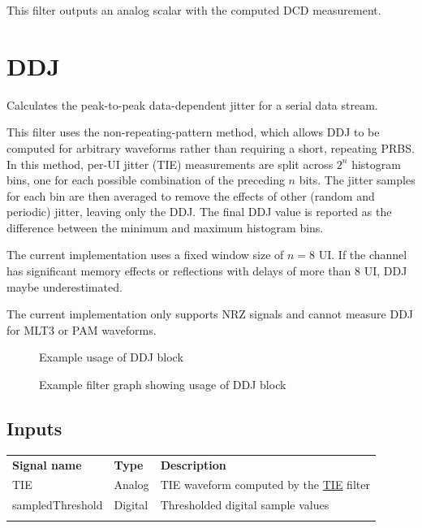 This filter outputs an analog scalar with the computed DCD measurement.

\pagebreak
\section{DDJ}
\label{filter:ddj}

Calculates the peak-to-peak data-dependent jitter for a serial data stream.

This filter uses the non-repeating-pattern method, which allows DDJ to be computed for arbitrary waveforms rather than
requiring a short, repeating PRBS. In this method, per-UI jitter (TIE) measurements are split across $2^n$ histogram
bins, one for each possible combination of the preceding $n$ bits. The jitter samples for each bin are then averaged to
remove the effects of other (random and periodic) jitter, leaving only the DDJ.  The final DDJ value is reported as the
difference between the minimum and maximum histogram bins.

The current implementation uses a fixed window size of $n=8$ UI. If the channel has significant memory effects or
reflections with delays of more than 8 UI, DDJ maybe underestimated.

The current implementation only supports NRZ signals and cannot measure DDJ for MLT3 or PAM waveforms.

\begin{figure}[h]
\centering
{}
\caption{Example usage of DDJ block}
\label{filter_ddj}
\end{figure}

\begin{figure}[h]
\centering
{}
\caption{Example filter graph showing usage of DDJ block}
\label{filter_graph_ddj}
\end{figure}

\subsection{Inputs}

\begin{tabularx}{16cm}{llX}
\thickhline
\textbf{Signal name} & \textbf{Type} & \textbf{Description} \\
\thickhline
TIE & Analog & TIE waveform computed by the \hyperref[filter:tie]{TIE} filter\\
\thinhline
sampledThreshold & Digital & Thresholded digital sample values\\
\thickhline
\end{tabularx}

